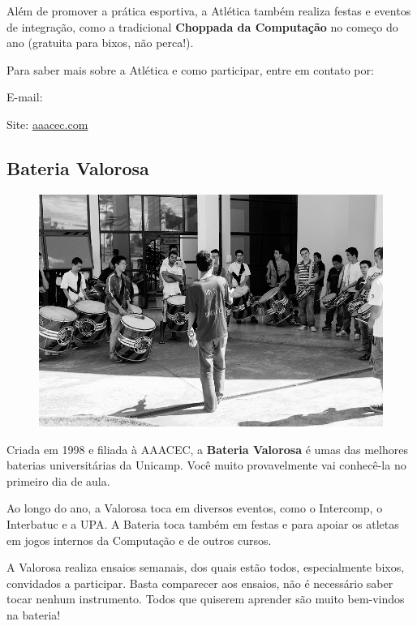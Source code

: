 Além de promover a prática esportiva, a Atlética também realiza festas e eventos
de integração, como a tradicional \textbf{Choppada da Computação} no começo do
ano (gratuita para bixos, não perca!).

Para saber mais sobre a Atlética e como participar, entre em contato por:

\begin{compactitemize}
\item  E-mail: 
\item  Site: \url{aaacec.com}
\end{compactitemize}

\subsection{Bateria Valorosa}

\begin{figure}[H]
    \centering
    \includegraphics[scale=0.27]{img/valorosa_foto.jpg}
\end{figure}

Criada em 1998 e filiada à AAACEC, a \textbf{Bateria Valorosa} é umas das
melhores baterias universitárias da Unicamp. Você muito provavelmente vai
conhecê-la no primeiro dia de aula.

Ao longo do ano, a Valorosa toca em diversos eventos, como o Intercomp, o
Interbatuc e a UPA. A Bateria toca também em festas e para apoiar os atletas em
jogos internos da Computação e de outros cursos.

A Valorosa realiza ensaios semanais, dos quais estão todos, especialmente bixos,
convidados a participar. Basta comparecer aos ensaios, não é necessário saber
tocar nenhum instrumento. Todos que quiserem aprender são muito bem-vindos na
bateria!

